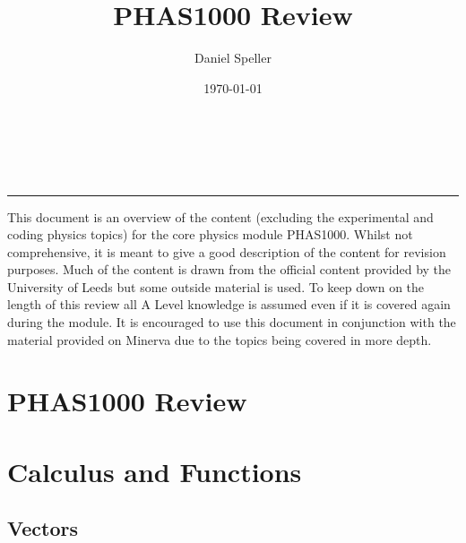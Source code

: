 \documentclass[11pt,titlepage]{article}
\title{PHAS1000 Review}
\author{Daniel Speller}
\date{\today}
\makeatletter
\renewcommand{\maketitle}{\bgroup\setlength{\parindent}{0pt}
\begin{flushleft}
  \textbf{\@title}\\
  \textbf{\@author}\\
  \textbf{\@date}
\end{flushleft}\egroup
}
\numberwithin{equation}{section}
\makeatother
\begin{document}
\thispagestyle{empty}
\maketitle

\noindent\rule{\linewidth}{0.4pt}
This document is an overview of the content (excluding the experimental and coding physics topics) for the core physics module PHAS1000. Whilst not comprehensive, it is meant to give a good description of the content for revision purposes. Much of the content is drawn from the official content provided by the University of Leeds but some outside material is used. To keep down on the length of this review all A Level knowledge is assumed even if it is covered again during the module. It is encouraged to use this document in conjunction with the material provided on Minerva due to the topics being covered in more depth.
\newpage

\section*{PHAS1000 Review}
\tableofcontents
\vspace{1cm}

\newpage

\section{Calculus and Functions} 
\subsection{Vectors}
\end{document}
